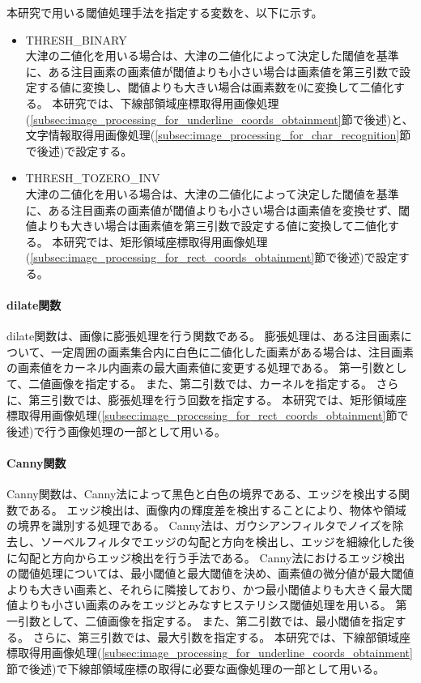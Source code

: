 本研究で用いる閾値処理手法を指定する変数を、以下に示す。

\begin{itemize}
	\item THRESH\_BINARY\\
		大津の二値化を用いる場合は、大津の二値化によって決定した閾値を基準に、ある注目画素の画素値が閾値よりも小さい場合は画素値を第三引数で設定する値に変換し、閾値よりも大きい場合は画素数を0に変換して二値化する。
		本研究では、下線部領域座標取得用画像処理(\ref{subsec:image_processing_for_underline_coords_obtainment}節で後述)と、文字情報取得用画像処理(\ref{subsec:image_processing_for_char_recognition}節で後述)で設定する。
	\item THRESH\_TOZERO\_INV\\
		大津の二値化を用いる場合は、大津の二値化によって決定した閾値を基準に、ある注目画素の画素値が閾値よりも小さい場合は画素値を変換せず、閾値よりも大きい場合は画素値を第三引数で設定する値に変換して二値化する。
		本研究では、矩形領域座標取得用画像処理(\ref{subsec:image_processing_for_rect_coords_obtainment}節で後述)で設定する。
\end{itemize}

\paragraph{dilate関数}
dilate関数は、画像に膨張処理を行う関数である。
膨張処理は、ある注目画素について、一定周囲の画素集合内に白色に二値化した画素がある場合は、注目画素の画素値をカーネル内画素の最大画素値に変更する処理である\cite{膨張処理}。
第一引数として、二値画像を指定する。
また、第二引数では、カーネルを指定する。
さらに、第三引数では、膨張処理を行う回数を指定する。
本研究では、矩形領域座標取得用画像処理(\ref{subsec:image_processing_for_rect_coords_obtainment}節で後述)で行う画像処理の一部として用いる。

\paragraph{Canny関数}
Canny関数は、Canny法によって黒色と白色の境界である、エッジを検出する関数である。
エッジ検出は、画像内の輝度差を検出することにより、物体や領域の境界を識別する処理である\cite{エッジ検出}。
Canny法は、ガウシアンフィルタでノイズを除去し、ソーベルフィルタでエッジの勾配と方向を検出し、エッジを細線化した後に勾配と方向からエッジ検出を行う手法である。
Canny法におけるエッジ検出の閾値処理については、最小閾値と最大閾値を決め、画素値の微分値が最大閾値よりも大きい画素と、それらに隣接しており、かつ最小閾値よりも大きく最大閾値よりも小さい画素のみをエッジとみなすヒステリシス閾値処理を用いる\cite{Canny法}。
第一引数として、二値画像を指定する。
また、第二引数では、最小閾値を指定する。
さらに、第三引数では、最大引数を指定する。
本研究では、下線部領域座標取得用画像処理(\ref{subsec:image_processing_for_underline_coords_obtainment}節で後述)で下線部領域座標の取得に必要な画像処理の一部として用いる。


